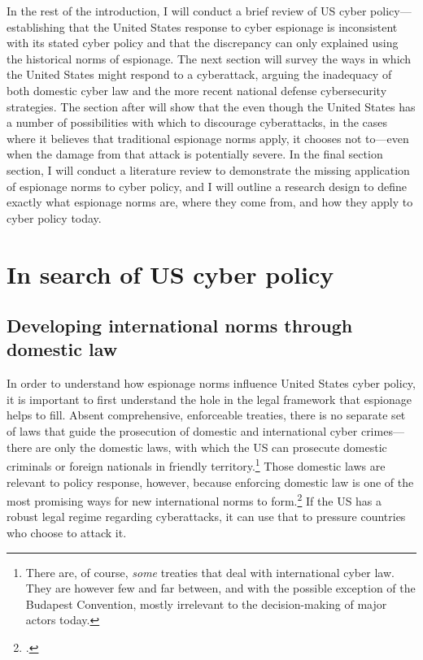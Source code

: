 \documentclass{memoir}
\begin{document}
\begin{refsegment}
In the rest of the introduction, I will conduct a brief review of US cyber policy---establishing that the United States response to cyber espionage is inconsistent with its stated cyber policy and that the discrepancy can only explained using the historical norms of espionage. The next section will survey the ways in which the United States might respond to a cyberattack, arguing the inadequacy of both domestic cyber law and the more recent national defense cybersecurity strategies. The section after will show that the even though the United States has a number of possibilities with which to discourage cyberattacks, in the cases where it believes that traditional espionage norms apply, it chooses not to---even when the damage from that attack is potentially severe. In the final section section, I will conduct a literature review to demonstrate the missing application of espionage norms to cyber policy, and I will outline a research design to define exactly what espionage norms are, where they come from, and how they apply to cyber policy today.

\section{In search of US cyber policy}
\subsection{Developing international norms through domestic law}
In order to understand how espionage norms influence United States cyber policy, it is important to first understand the hole in the legal framework that espionage helps to fill. Absent comprehensive, enforceable treaties, there is no separate set of laws that guide the prosecution of domestic and international cyber crimes---there are only the domestic laws, with which the US can prosecute domestic criminals or foreign nationals in friendly territory.\footnote{There are, of course, \emph{some} treaties that deal with international cyber law. They are however few and far between, and with the possible exception of the Budapest Convention, mostly irrelevant to the decision-making of major actors today.} Those domestic laws are relevant to policy response, however, because enforcing domestic law is one of the most promising ways for new international norms to form.\footcite[p.~295]{deeks_international_2015} If the US has a robust legal regime regarding cyberattacks, it can use that to pressure countries who choose to attack it.


\end{refsegment}
\end{document}
